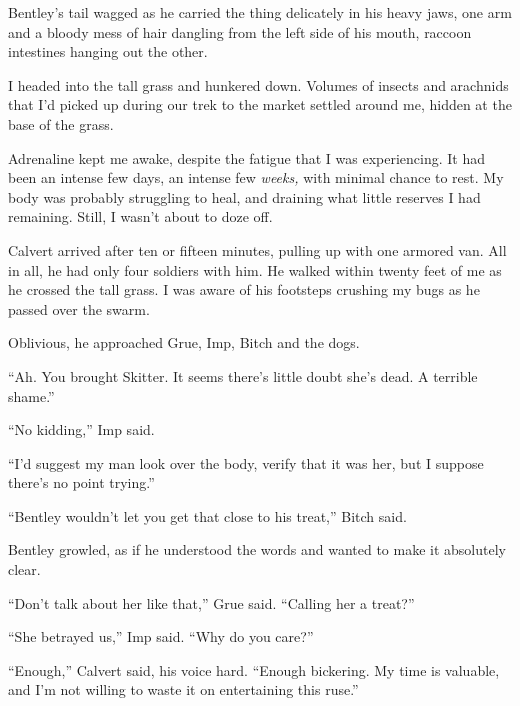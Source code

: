 Bentley's tail wagged as he carried the thing delicately in his heavy jaws, one arm and a bloody mess of hair dangling from the left side of his mouth, raccoon intestines hanging out the other.



I headed into the tall grass and hunkered down.  Volumes of insects and arachnids that I'd picked up during our trek to the market settled around me, hidden at the base of the grass.



Adrenaline kept me awake, despite the fatigue that I was experiencing.  It had been an intense few days, an intense few \emph{weeks, }with minimal chance to rest.  My body was probably struggling to heal, and draining what little reserves I had remaining.  Still, I wasn't about to doze off.



Calvert arrived after ten or fifteen minutes, pulling up with one armored van.  All in all, he had only four soldiers with him.  He walked within twenty feet of me as he crossed the tall grass.  I was aware of his footsteps crushing my bugs as he passed over the swarm.



Oblivious, he approached Grue, Imp, Bitch and the dogs.



``Ah.  You brought Skitter.  It seems there's little doubt she's dead.  A terrible shame.''



``No kidding,'' Imp said.



``I'd suggest my man look over the body, verify that it was her, but I suppose there's no point trying.''



``Bentley wouldn't let you get that close to his treat,'' Bitch said.



Bentley growled, as if he understood the words and wanted to make it absolutely clear.



``Don't talk about her like that,'' Grue said.  ``Calling her a treat?''



``She betrayed us,'' Imp said.  ``Why do you care?''



``Enough,'' Calvert said, his voice hard.  ``Enough bickering.  My time is valuable, and I'm not willing to waste it on entertaining this ruse.''



